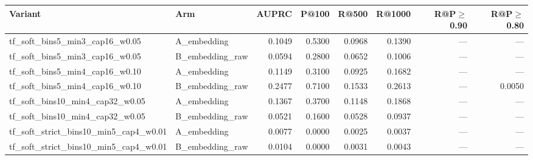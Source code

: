 \begin{tabular}{llrrrrrr}
\hline
Variant & Arm & AUPRC & P@100 & R@500 & R@1000 & R@P$\ge$0.90 & R@P$\ge$0.80 \\
\hline
tf\_soft\_bins5\_min3\_cap16\_w0.05 & A\_embedding & 0.1049 & 0.5300 & 0.0968 & 0.1390 & — & — \\
tf\_soft\_bins5\_min3\_cap16\_w0.05 & B\_embedding\_raw & 0.0594 & 0.2800 & 0.0652 & 0.1006 & — & — \\
tf\_soft\_bins5\_min4\_cap16\_w0.10 & A\_embedding & 0.1149 & 0.3100 & 0.0925 & 0.1682 & — & — \\
tf\_soft\_bins5\_min4\_cap16\_w0.10 & B\_embedding\_raw & 0.2477 & 0.7100 & 0.1533 & 0.2613 & — & 0.0050 \\
tf\_soft\_bins10\_min4\_cap32\_w0.05 & A\_embedding & 0.1367 & 0.3700 & 0.1148 & 0.1868 & — & — \\
tf\_soft\_bins10\_min4\_cap32\_w0.05 & B\_embedding\_raw & 0.0521 & 0.1600 & 0.0528 & 0.0937 & — & — \\
tf\_soft\_strict\_bins10\_min5\_cap4\_w0.01 & A\_embedding & 0.0077 & 0.0000 & 0.0025 & 0.0037 & — & — \\
tf\_soft\_strict\_bins10\_min5\_cap4\_w0.01 & B\_embedding\_raw & 0.0104 & 0.0000 & 0.0031 & 0.0043 & — & — \\
\hline
\end{tabular}
